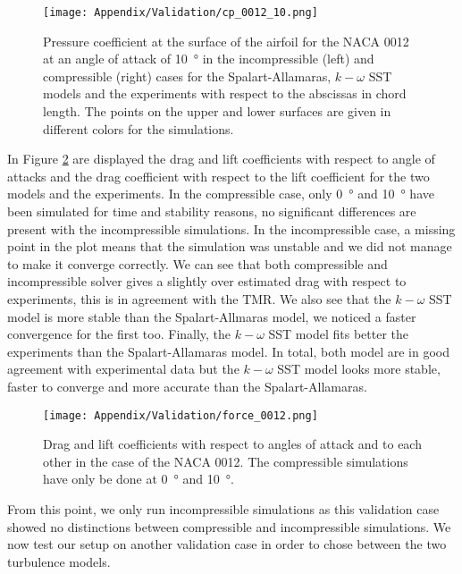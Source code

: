 \begin{subappendices}
	\begin{figure}
		\centering
		\texttt{[image: Appendix/Validation/cp\_0012\_10.png]}
		\caption[Pressure coefficient for a \acrshort{NACA} 0012 at \SI{10}{\degree}.]{Pressure coefficient at the surface of the airfoil for the \acrshort{NACA} 0012 at an angle of attack of \SI{10}{\degree} in the incompressible (left) and compressible (right) cases for the Spalart-Allamaras,  $k-\omega$ SST models and the experiments with respect to the abscissas in chord length. The points on the upper and lower surfaces are given in different colors for the simulations.}
		\label{fig:cp_0012_10}
	\end{figure}
	
	In Figure \ref{fig:force_0012} are displayed the drag and lift coefficients with respect to angle of attacks and the drag coefficient with respect to the lift coefficient for the two models and the experiments. In the compressible case, only \SI{0}{\degree} and \SI{10}{\degree} have been simulated for time and stability reasons, no significant differences are present with the incompressible simulations. In the incompressible case, a missing point in the plot means that the simulation was unstable and we did not manage to make it converge correctly. We can see that both compressible and incompressible solver gives a slightly over estimated drag with respect to experiments, this is in agreement with the \acrshort{TMR}. We also see that the $k-\omega$ SST model is more stable than the Spalart-Allmaras model, we noticed a faster convergence for the first too. Finally, the $k-\omega$ SST model fits better the experiments than the Spalart-Allamaras model. In total, both model are in good agreement with experimental data but the $k-\omega$ SST model looks more stable, faster to converge and more accurate than the Spalart-Allamaras.
	
	\begin{figure}
		\centering
		\texttt{[image: Appendix/Validation/force\_0012.png]}
		\caption[Force coefficients w.r.t. angles of attack for a \acrshort{NACA} 0012.]{Drag and lift coefficients with respect to angles of attack and to each other in the case of the \acrshort{NACA} 0012. The compressible simulations have only be done at \SI{0}{\degree} and \SI{10}{\degree}.}
		\label{fig:force_0012}
	\end{figure}
	
	From this point, we only run incompressible simulations as this validation case showed no distinctions between compressible and incompressible simulations. We now test our setup on another validation case in order to chose between the two turbulence models.
	

\end{subappendices}
